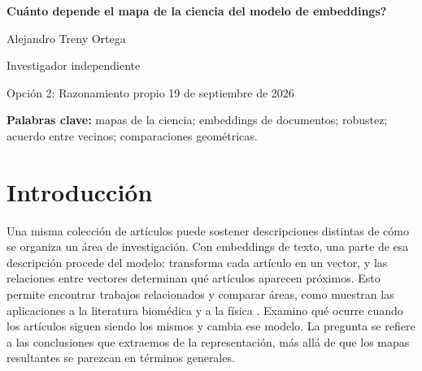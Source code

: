 \documentclass[12pt]{article}
\begin{document}
\begin{center}
{\LARGE\bfseries \textquestiondown{}Cuánto depende el mapa de la ciencia del modelo de embeddings?\par}
\vspace{12pt}
{\large Alejandro Treny Ortega\par}
\smallskip
Investigador independiente\par
\medskip
{\small Opción 2: Razonamiento propio \textbullet{} 19 de septiembre de 2026\par}
\end{center}

\begin{abstract}
Cambiar de modelo de embeddings cambia la representación de los artículos científicos. La pregunta es qué conclusiones cambian con ella. Comparo diez modelos sobre un corpus fijo de 500.000 registros de OpenAlex, de 26 áreas y del período 2000--2024, mediante muestras emparejadas que examinan centros de áreas, estructura interna y vecinos próximos, junto con las decisiones de entrada y representación. Los modelos comparten una estructura general, pero conservan de media solo el 30,3\% de los 25 vecinos más próximos dentro de los grupos de área y período. Quitar el resumen cambia los vecinos casi tanto como cambiar de modelo; quitar el título cambia menos. Un análisis exploratorio posterior de las 325 parejas de áreas encuentra órdenes opuestos persistentes entre modelos en 262 parejas para la apertura angular y 221 para la dimensión lineal efectiva. Al exigir diferencias relativas superiores al 5\%, quedan 96 y 177. Las medidas alternativas conservan muchas oposiciones, con una dependencia adicional del centrado y la combinación de las salidas. Una comparación entre áreas puede, por tanto, resistir la selección repetida de artículos e invertirse entre modelos. Estos resultados describen geometría, sin establecer corrección temática. Defiendo que la robustez debe evaluarse sobre la afirmación que se extrae del mapa: el acuerdo general puede coexistir con desacuerdo en la comparación que interesa.
\end{abstract}
\textbf{Palabras clave:} mapas de la ciencia; embeddings de documentos; robustez; acuerdo entre vecinos; comparaciones geométricas.

\section{Introducción}
Una misma colección de artículos puede sostener descripciones distintas de cómo se organiza un área de investigación. Con embeddings de texto, una parte de esa descripción procede del modelo: transforma cada artículo en un vector, y las relaciones entre vectores determinan qué artículos aparecen próximos. Esto permite encontrar trabajos relacionados y comparar áreas, como muestran las aplicaciones a la literatura biomédica y a la física \citep{refbe130e2973,refc0e2cc29e0}. Examino qué ocurre cuando los artículos siguen siendo los mismos y cambia ese modelo. La pregunta se refiere a las conclusiones que extraemos de la representación, más allá de que los mapas resultantes se parezcan en términos generales.
\end{document}
